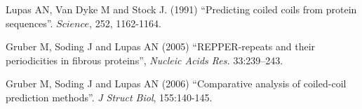 \documentclass[11pt,english]{article}
\begin{document}
\begin{thebibliography}{99}

 Lupas AN, Van Dyke M and  Stock J. (1991)  ``Predicting coiled coils from protein
   sequences''. $Science$, 252, 1162-1164.

 Gruber M, Soding J and Lupas AN (2005) ``REPPER-repeats and their periodicities 
in fibrous proteins'', {\em Nucleic Acids Res.} 33:239–243.

 Gruber M, Soding J and Lupas AN (2006)
``Comparative analysis of coiled-coil prediction methods''. {\em J Struct Biol}, 155:140-145.

\end{thebibliography}
\end{document}
